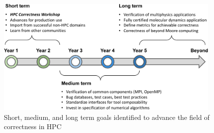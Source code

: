 \begin{figure}
\label{figure:goals}
\centering
\begin{adjustbox}{width=1.15\textwidth,center}
\includegraphics[width=0.99\textwidth]{figures/future_goals.pdf}
\end{adjustbox}
\caption{Short, medium, and long term goals identified to advance the field of correctness in HPC}
\end{figure}
